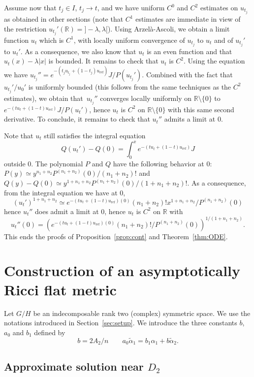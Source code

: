 \documentclass[10pt]{amsart}
\theoremstyle{plain}
\theoremstyle{definition}
\begin{document}
Assume now that $t_j\in I$, $t_j\to t$, and we have uniform
$C^0$ and $C^2$ estimates on $u_{t_j}$ as obtained in other sections
(note that $C^1$ estimates are immediate in view of the restriction
$u_{t_j}'(\mathbb{R})={}]-\lambda,\lambda[$).
Using Arzelà-Ascoli, we obtain a limit function $u_t$ which is $C^1$,
with locally uniform convergence of $u_{t_j}$ to $u_t$ and of
$u_{t_j}'$ to $u_t'$. As a consequence, we also know that $u_t$ is an
even function and that $u_t(x)-\lambda |x|$ is bounded. It remains to
check that $u_t$ is $C^2$. Using the equation we have
$u_{t_j}''=e^{-(t_ju_{t_j}+(1-t_j)u_{\mathrm{ref}})}J/P(u_{t_j}')$.
Combined with the fact that $u_{t_j}'/u_0'$ is uniformly bounded (this
follows from the same techniques as the $C^2$ estimates), we obtain that~$u_{t_j}''$ converges locally uniformly on $\mathbb{R}\setminus \{0\}$ to
$e^{-(tu_t+(1-t)u_{\mathrm{ref}})}J/P(u_t')$, hence $u_t$ is $C^2$ on
$\mathbb{R}\setminus \{0\}$ with this same second derivative.
To conclude, it remains to check that $u_t''$ admits a limit at $0$.

Note that $u_t$ still satisfies the integral equation
\[ Q(u_t')-Q(0)=\int_0^xe^{-(tu_t+(1-t)u_{\mathrm{ref}})}J \]
outside $0$.
The polynomial $P$ and $Q$ have the following behavior at $0$:
$P(y)\simeq y^{n_1+n_2}P^{(n_1+n_2)}(0)/(n_1+n_2)!$ and
$Q(y)-Q(0)\simeq y^{1+n_1+n_2}P^{(n_1+n_2)}(0)/(1+n_1+n_2)!$.
As a consequence, from the integral equation we have at $0$,
\[ (u_t')^{1+n_1+n_2}\simeq e^{-(tu_t+(1-t)u_{\mathrm{ref}})(0)}(n_1+n_2)!x^{1+n_1+n_2}/P^{(n_1+n_2)}(0) \]
hence $u_t''$ does admit a limit at $0$, hence $u_t$ is $C^2$
on $\mathbb{R}$ with
\[ u_t''(0)=\left(e^{-(tu_t+(1-t)u_{\mathrm{ref}})(0)}(n_1+n_2)!/P^{(n_1+n_2)}(0)\right)^{1/(1+n_1+n_2)}. \]
This ends the proofs of Proposition~\ref{prop:cont} and Theorem~\ref{thm:ODE}.

\section{Construction of an asymptotically Ricci flat metric}
\label{sec:constr-an-asympt}

Let $G/H$ be an indecomposable rank two (complex) symmetric space. We use the notations introduced in Section~\ref{sec:setup}.
We introduce the three constants $b$, $a_0$ and $b_1$ defined by
\[ b=2A_2/n \qquad a_0\tilde{\alpha}_1=b_1\alpha_1+b\tilde{\alpha}_2. \]

\subsection{Approximate solution near $D_2$}
\label{sec:appr-solut-near}
\end{document}
